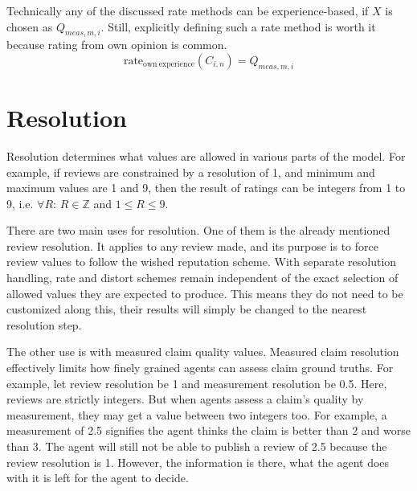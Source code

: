 \documentclass[%
    ]{\PathToTumTemplate/thesis/tum_thesis}
\begin{document}
Technically any of the discussed rate methods can be experience-based, if $X$ is chosen as $Q_{meas,m,i}$.
Still, explicitly defining such a rate method is worth it because rating from own opinion is common.
\begin{equation}\label{eq:rate_own_experience}
\mathrm{rate_{own~experience}}(C_{i,n}) = Q_{meas,m,i}
\end{equation}



\section{Resolution}\label{sec:approach_resolution}
Resolution determines what values are allowed in various parts of the model.
For example, if reviews are constrained by a resolution of 1, and minimum and maximum values are 1 and 9, then the result of ratings can be integers from 1 to 9, i.e. $\forall R$: $R\in\mathbb{Z}$ and $1 \le R \le 9$.

There are two main uses for resolution.
One of them is the already mentioned review resolution.
It applies to any review made, and its purpose is to force review values to follow the wished reputation scheme.
With separate resolution handling, rate and distort schemes remain independent of the exact selection of allowed values they are expected to produce.
This means they do not need to be customized along this, their results will simply be changed to the nearest resolution step.

The other use is with measured claim quality values.
Measured claim resolution effectively limits how finely grained agents can assess claim ground truths.
For example, let review resolution be 1 and measurement resolution be 0.5.
Here, reviews are strictly integers.
But when agents assess a claim's quality by measurement, they may get a value between two integers too.
For example, a measurement of 2.5 signifies the agent thinks the claim is better than 2 and worse than 3.
The agent will still not be able to publish a review of 2.5 because the review resolution is 1.
However, the information is there, what the agent does with it is left for the agent to decide.
\end{document}
